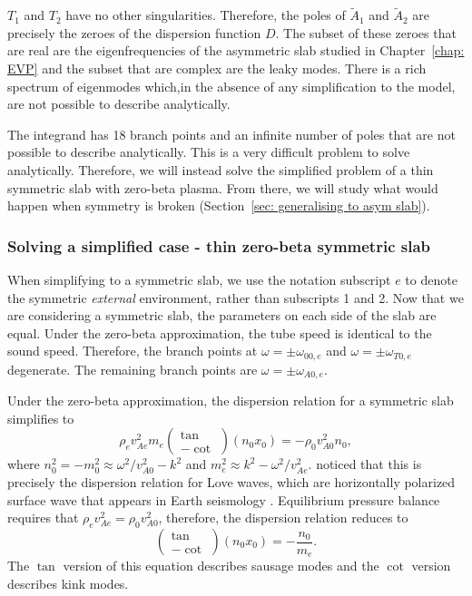 $T_1$ and $T_2$ have no other singularities. Therefore, the poles of $\tilde{A}_1$ and $\tilde{A}_2$ are precisely the zeroes of the dispersion function $D$. The subset of these zeroes that are real are the eigenfrequencies of the asymmetric slab studied in Chapter~\ref{chap: EVP} and the subset that are complex are the leaky modes. There is a rich spectrum of eigenmodes which,in the absence of any simplification to the model, are not possible to describe analytically.

The integrand has 18 branch points and an infinite number of poles that are not possible to describe analytically. This is a very difficult problem to solve analytically. Therefore, we will instead solve the simplified problem of a thin symmetric slab with zero-beta plasma. From there, we will study what would happen when symmetry is broken (Section~\ref{sec: generalising to asym slab}).

\subsubsection{Solving a simplified case - thin zero-beta symmetric slab}

When simplifying to a symmetric slab, we use the notation subscript $e$ to denote the symmetric \textit{external} environment, rather than subscripts 1 and 2. Now that we are considering a symmetric slab, the parameters on each side of the slab are equal. Under the zero-beta approximation, the tube speed is identical to the sound speed. Therefore, the branch points at $\omega = \pm \omega_{00,e}$ and $\omega = \pm\omega_{T0,e}$ degenerate. The remaining branch points are $\omega = \pm \omega_{A0,e}$.

Under the zero-beta approximation, the dispersion relation for a symmetric slab simplifies to
\begin{equation}
\rho_ev_{Ae}^2m_e\left(
\begin{matrix}
\tan \\
-\cot
\end{matrix} \right)(n_0x_0) = -\rho_0v_{A0}^2n_0,
\end{equation}
where $n_0^2 = -m_0^2 \approx \omega^2/v_{A0}^2 - k^2$ and $m_e^2 \approx k^2 - \omega^2/v_{Ae}^2$. \cite{edw_etal82} noticed that this is precisely the dispersion relation for Love waves, which are horizontally polarized surface wave that appears in Earth seismology \citep{lov11}. Equilibrium pressure balance requires that $\rho_ev_{Ae}^2 = \rho_0v_{A0}^2$, therefore, the dispersion relation reduces to
\begin{equation}
\left(
\begin{matrix}
\tan \\
-\cot
\end{matrix} \right)(n_0x_0) = -\frac{n_0}{m_e}.
\end{equation}
The $\tan$ version of this equation describes sausage modes and the $\cot$ version describes kink modes.

